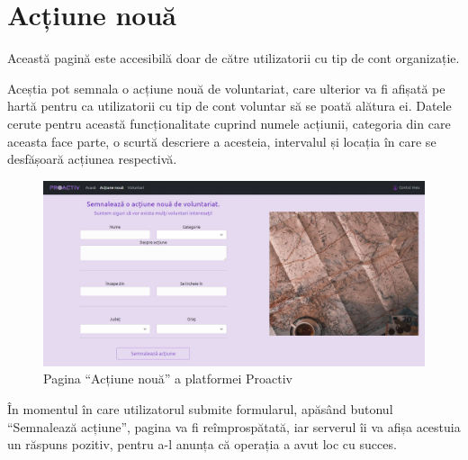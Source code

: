 \documentclass[12pt,a4paper]{report}
\begin{document}
\section{Acțiune nouă}
\par
Această pagină este accesibilă doar de către utilizatorii cu tip de cont organizație.
\\ \par
Aceștia pot semnala o acțiune nouă de voluntariat, care ulterior va fi afișată pe hartă pentru ca utilizatorii cu tip de cont voluntar să se poată alătura ei. Datele cerute pentru această funcționalitate cuprind numele acțiunii, categoria din care aceasta face parte, o scurtă descriere a acesteia, intervalul și locația în care se desfășoară acțiunea respectivă.
\\
\begin{figure}[H]
\centering
  \includegraphics[width=1\linewidth]{./imagini/actiunenoua.jpg}
  \caption{Pagina “Acțiune nouă” a platformei Proactiv}
\end{figure}
\par
În momentul în care utilizatorul submite formularul, apăsând butonul “Semnalează acțiune”, pagina va fi reîmprospătată, iar serverul îi va afișa acestuia un răspuns pozitiv, pentru a-l anunța că operația a avut loc cu succes. 

\newpage
\end{document}

